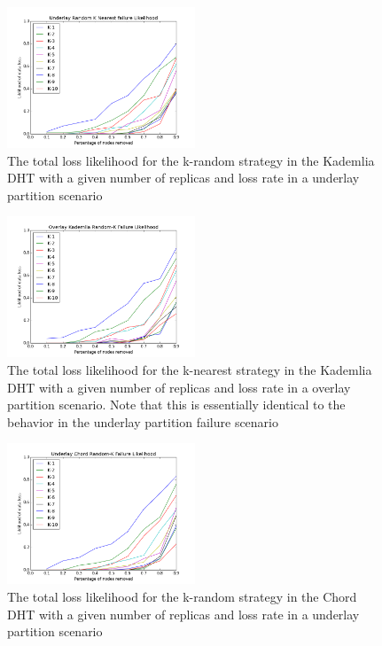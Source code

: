 	\begin{figure}[h!]
		\includegraphics[width=0.5\textwidth]{figs/underlay_kad_random}
		\caption{The total loss likelihood for the k-random strategy in the Kademlia DHT with a given number of replicas and loss rate in a underlay partition scenario}
	\end{figure}
	\begin{figure}[h!]
		\includegraphics[width=0.5\textwidth]{figs/overlay_kad_random}
		\caption{The total loss likelihood for the k-nearest strategy in the Kademlia DHT with a given number of replicas and loss rate in a overlay partition scenario. Note that this is essentially identical to the behavior in the underlay partition failure scenario}
	\end{figure}
	\begin{figure}[h!]
		\includegraphics[width=0.5\textwidth]{figs/underlay_chord_random}
		\caption{The total loss likelihood for the k-random strategy in the Chord DHT with a given number of replicas and loss rate in a underlay partition scenario}
	\end{figure}
